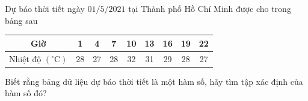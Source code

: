 \begin{bt}%
	Dự báo thời tiết ngày $01 / 5 / 2021$ tại Thành phố Hồ Chí Minh được cho trong bảng sau
	\begin{center}
		\begin{tabular}{|c|c|c|c|c|c|c|c|c|}
			\hline Giờ & 1 & 4 & 7 & 10 & 13 & 16 & 19 & 22 \\
			\hline Nhiệt độ $\left({ }^{\circ} \mathrm{C}\right)$ & 28 & 27 & 28 & 32 & 31 & 29 & 28 & 27 \\
			\hline
		\end{tabular}
	\end{center}
	
Biết rằng bảng dữ liệu dự báo thời tiết là một hàm số, hãy tìm tập xác định của hàm số đó?
\end{bt}

